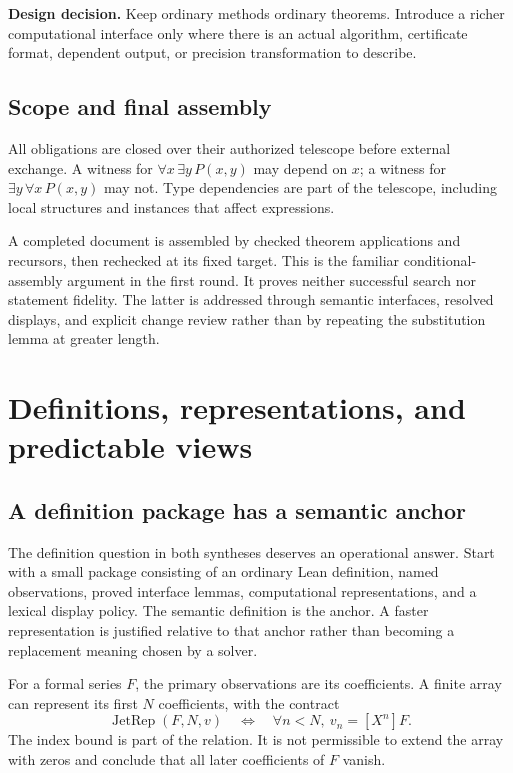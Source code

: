\documentclass[11pt,letterpaper]{article}
\newcommand{\coeff}[2]{[#1^{#2}]}
\newcommand{\decision}[1]{\par\smallskip\textbf{Design decision.} #1\par\smallskip}
\theoremstyle{definition}
\begin{document}
\decision{Keep ordinary methods ordinary theorems. Introduce a richer computational
interface only where there is an actual algorithm, certificate format, dependent
output, or precision transformation to describe.}

\subsection{Scope and final assembly}
All obligations are closed over their authorized telescope before external
exchange. A witness for \(\forall x\,\exists y\,P(x,y)\) may depend on \(x\);
a witness for \(\exists y\,\forall x\,P(x,y)\) may not. Type dependencies are part
of the telescope, including local structures and instances that affect expressions.

A completed document is assembled by checked theorem applications and recursors,
then rechecked at its fixed target. This is the familiar conditional-assembly
argument in the first round\cite{synthesis,review}. It proves neither successful
search nor statement fidelity. The latter is addressed through semantic
interfaces, resolved displays, and explicit change review rather than by repeating
the substitution lemma at greater length.

\section{Definitions, representations, and predictable views}\label{sec:views}
\subsection{A definition package has a semantic anchor}
The definition question in both syntheses deserves an operational answer. Start
with a small package consisting of an ordinary Lean definition, named observations,
proved interface lemmas, computational representations, and a lexical display
policy. The semantic definition is the anchor. A faster representation is justified
relative to that anchor rather than becoming a replacement meaning chosen by a
solver.

For a formal series \(F\), the primary observations are its coefficients. A finite
array can represent its first \(N\) coefficients, with the contract
\[
 \operatorname{JetRep}(F,N,v)\quad\Longleftrightarrow\quad
 \forall n<N,\ v_n=\coeff Xn F.
\]
The index bound is part of the relation. It is not permissible to extend the array
with zeros and conclude that all later coefficients of \(F\) vanish.
\end{document}

